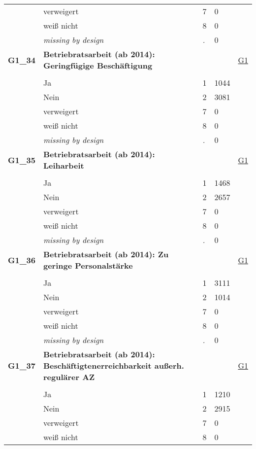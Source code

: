 \begin{longtable}{| L{2.65cm} | L{8cm} | C{1.5cm} | R{1.25cm} | C{2.25cm}  |}
   & verweigert & 7 & 0 &  \\ 
   & weiß nicht & 8 & 0 &  \\ 
   & \textit{missing by design} & \textit{.} & 0 &  \\ 
   \midrule
\textbf{G1\_34}\label{var:G1:34} & \textbf{Betriebratsarbeit (ab 2014): Geringfügige Beschäftigung} &  &  & \hyperref[G1]{G1} \\ 
   &  &  &  &  \\ 
   & Ja & 1 & 1044 &  \\ 
   & Nein & 2 & 3081 &  \\ 
   & verweigert & 7 & 0 &  \\ 
   & weiß nicht & 8 & 0 &  \\ 
   & \textit{missing by design} & \textit{.} & 0 &  \\ 
   \midrule
\textbf{G1\_35}\label{var:G1:35} & \textbf{Betriebratsarbeit (ab 2014): Leiharbeit} &  &  & \hyperref[G1]{G1} \\ 
   &  &  &  &  \\ 
   & Ja & 1 & 1468 &  \\ 
   & Nein & 2 & 2657 &  \\ 
   & verweigert & 7 & 0 &  \\ 
   & weiß nicht & 8 & 0 &  \\ 
   & \textit{missing by design} & \textit{.} & 0 &  \\ 
   \midrule
\textbf{G1\_36}\label{var:G1:36} & \textbf{Betriebratsarbeit (ab 2014): Zu geringe Personalstärke} &  &  & \hyperref[G1]{G1} \\ 
   &  &  &  &  \\ 
   & Ja & 1 & 3111 &  \\ 
   & Nein & 2 & 1014 &  \\ 
   & verweigert & 7 & 0 &  \\ 
   & weiß nicht & 8 & 0 &  \\ 
   & \textit{missing by design} & \textit{.} & 0 &  \\ 
   \midrule
\textbf{G1\_37}\label{var:G1:37} & \textbf{Betriebratsarbeit (ab 2014): Beschäftigtenerreichbarkeit außerh. regulärer AZ} &  &  & \hyperref[G1]{G1} \\ 
   &  &  &  &  \\ 
   & Ja & 1 & 1210 &  \\ 
   & Nein & 2 & 2915 &  \\ 
   & verweigert & 7 & 0 &  \\ 
   & weiß nicht & 8 & 0 &  \\ 

\end{longtable}
